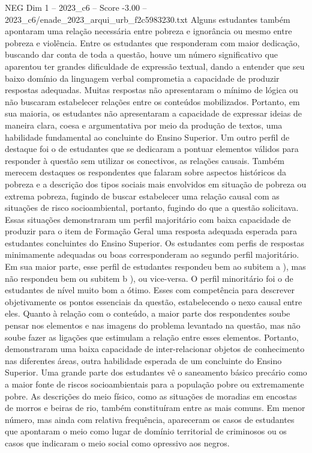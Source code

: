 \begin{textsample}{NEG Dim 1 – 2023\_c6 – Score -3.00 – 2023\_c6/enade\_2023\_arqui\_urb\_f2c5983230.txt}
Alguns estudantes também apontaram uma relação necessária entre pobreza e ignorância ou mesmo entre pobreza e violência.
Entre os estudantes que responderam com maior dedicação, buscando dar conta de toda a questão, houve um número significativo que aparentou ter grandes dificuldade de expressão textual, dando a entender que seu baixo domínio da linguagem verbal comprometia a capacidade de produzir respostas adequadas.
Muitas respostas não apresentaram o mínimo de lógica ou não buscaram estabelecer relações entre os conteúdos mobilizados.
Portanto, em sua maioria, os estudantes não apresentaram a capacidade de expressar ideias de maneira clara, coesa e argumentativa por meio da produção de textos, uma habilidade fundamental ao concluinte do Ensino Superior.
Um outro perfil de destaque foi o de estudantes que se dedicaram a pontuar elementos válidos para responder à questão sem utilizar os conectivos, as relações causais.
Também merecem destaques os respondentes que falaram sobre aspectos históricos da pobreza e a descrição dos tipos sociais mais envolvidos em situação de pobreza ou extrema pobreza, fugindo de buscar estabelecer uma relação causal com as situações de risco socioambiental, portanto, fugindo do que a questão solicitava.
Essas situações demonstraram um perfil majoritário com baixa capacidade de produzir para o item de Formação Geral uma resposta adequada esperada para estudantes concluintes do Ensino Superior.
Os estudantes com perfis de respostas minimamente adequadas ou boas corresponderam ao segundo perfil majoritário.
Em sua maior parte, esse perfil de estudantes respondeu bem ao subitem a ), mas não respondeu bem ou subitem b ), ou vice-versa.
O perfil minoritário foi o de estudantes de nível muito bom a ótimo.
Esses com competência para descrever objetivamente os pontos essenciais da questão, estabelecendo o nexo causal entre eles.
Quanto à relação com o conteúdo, a maior parte dos respondentes soube pensar nos elementos e nas imagens do problema levantado na questão, mas não soube fazer as ligações que estimulam a relação entre esses elementos.
Portanto, demonstraram uma baixa capacidade de inter-relacionar objetos de conhecimento nas diferentes áreas, outra habilidade esperada de um concluinte do Ensino Superior.
Uma grande parte dos estudantes vê o saneamento básico precário como a maior fonte de riscos socioambientais para a população pobre ou extremamente pobre.
As descrições do meio físico, como as situações de moradias em encostas de morros e beiras de rio, também constituíram entre as mais comuns.
Em menor número, mas ainda com relativa frequência, apareceram os casos de estudantes que apontaram o meio como lugar de domínio territorial de criminosos ou os casos que indicaram o meio social como opressivo aos negros.

\end{textsample}
